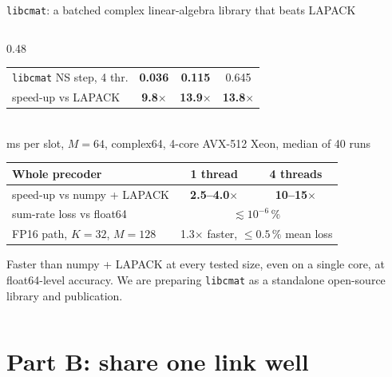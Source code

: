\documentclass[aspectratio=169,10pt,xcolor={table,dvipsnames}]{beamer}
\newcommand{\gd}[1]{\textcolor{good}{\textbf{#1}}}
\newcommand{\ours}{\rowcolor{good!14}}
\begin{document}
\begin{frame}{\texttt{libcmat}: a batched complex linear-algebra library that beats LAPACK}
\begin{columns}[T]
\begin{column}{0.48\textwidth}
\begin{tabular}{lccc}
\ours \texttt{libcmat} NS step, 4 thr. & \textbf{0.036} & \textbf{0.115} & 0.645 \\
speed-up vs LAPACK & \gd{9.8$\times$} & \gd{13.9$\times$} & \gd{13.8$\times$} \\
\bottomrule
\end{tabular}\\[2pt]
{\tiny ms per slot, $M{=}64$, complex64, 4-core AVX-512 Xeon, median of 40 runs}\\[4pt]
\begin{tabular}{lcc}
\toprule
Whole precoder & 1 thread & 4 threads \\
\midrule
speed-up vs numpy + LAPACK & \gd{2.5--4.0$\times$} & \gd{10--15$\times$} \\
sum-rate loss vs float64 & \multicolumn{2}{c}{$\lesssim 10^{-6}\,\%$} \\
FP16 path, $K{=}32$, $M{=}128$ & \multicolumn{2}{c}{1.3$\times$ faster, $\le 0.5\,\%$ mean loss} \\
\bottomrule
\end{tabular}
\vspace{0.4em}
\begin{takeaway}
\scriptsize Faster than numpy + LAPACK at every tested size, even on a single core, at float64-level accuracy. We are preparing \texttt{libcmat} as a standalone open-source library and publication.
\end{takeaway}
\end{column}
\end{columns}
\end{frame}

\section{Part B: share one link well}
\end{document}
